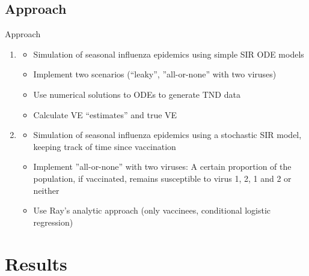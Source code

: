 \documentclass{beamer}
\begin{document}
\subsection{Approach}
\begin{frame}{Approach}
%
\begin{enumerate}
	\item<2-> 	\begin{itemize}
		\item Simulation of seasonal influenza epidemics using simple SIR ODE models
		\item Implement two scenarios (``leaky'', ''all-or-none'' with two viruses)
		\item Use numerical solutions to ODEs to generate TND data
		\item Calculate VE ``estimates'' and true VE
	\end{itemize}
	\item<3-> 	\begin{itemize}
	\item Simulation of seasonal influenza epidemics using a stochastic SIR model, keeping track of time since vaccination
	\item Implement ''all-or-none'' with two viruses: A certain proportion of the population, if vaccinated, remains susceptible to virus 1, 2, 1 and 2 or neither 
	\item Use Ray's analytic approach (only vaccinees, conditional logistic regression)
\end{itemize}
\end{enumerate}
\end{frame}
%
\section{Results}
\end{document}
